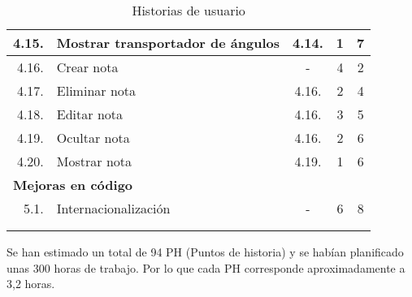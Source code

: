 \begin{longtable} {r l c c c}
	\hline
	4.15.	&	Mostrar transportador de ángulos	&	4.14.			&	1				&	7	\\
	\hline
	4.16.	&	Crear nota							&	-				&	4				&	2	\\
	\hline
	4.17.	&	Eliminar nota						&	4.16.			&	2				&	4	\\
	\hline
	4.18.	&	Editar nota							&	4.16.			&	3				&	5	\\
	\hline
	4.19.	&	Ocultar nota						&	4.16.			&	2				&	6	\\
	\hline
	4.20.	&	Mostrar nota						&	4.19.			&	1				&	6	\\
	\hline
	\multicolumn{5}{l}{\textbf{Mejoras en código}} \\
	\hline
	5.1.	&	Internacionalización				&	-				&	6				&	8	\\
	\hline
	\\
	\caption{Historias de usuario}
	\label{tab:hus}
\end{longtable}

Se han estimado un total de 94 PH (Puntos de historia) y se habían planificado unas 300 horas de trabajo. Por lo que cada PH corresponde aproximadamente a 3,2 horas.